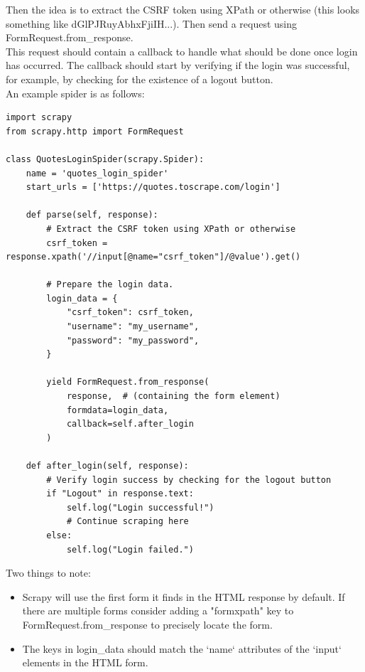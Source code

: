 \documentclass[8pt]{extarticle}
\begin{document}
\begin{multicols}{3}
Then the idea is to extract the CSRF token using XPath or otherwise (this looks something like dGlPJRuyAbhxFjiIH...). Then send a request using FormRequest.from\_response. \\

This request should contain a callback to handle what should be done once login has occurred. The callback should start by verifying if the login was successful, for example, by checking for the existence of a logout button.\\ 

An example spider is as follows:

\begin{lstlisting}[style=python]
import scrapy
from scrapy.http import FormRequest

class QuotesLoginSpider(scrapy.Spider):
    name = 'quotes_login_spider'
    start_urls = ['https://quotes.toscrape.com/login']

    def parse(self, response):
        # Extract the CSRF token using XPath or otherwise
        csrf_token = response.xpath('//input[@name="csrf_token"]/@value').get()

        # Prepare the login data. 
        login_data = {
            "csrf_token": csrf_token,
            "username": "my_username",
            "password": "my_password",
        }
        
        yield FormRequest.from_response(
            response,  # (containing the form element)
            formdata=login_data,
            callback=self.after_login
        )    
        
    def after_login(self, response):
        # Verify login success by checking for the logout button
        if "Logout" in response.text:
            self.log("Login successful!")
            # Continue scraping here
        else:
            self.log("Login failed.")
\end{lstlisting}

Two things to note:
\begin{itemize}
    \item Scrapy will use the first form it finds in the HTML response by default. If there are multiple forms consider adding a "formxpath" key to FormRequest.from\_response to precisely locate the form.
    \item The keys in login\_data should match the `name` attributes of the `input` elements in the HTML form.
\end{itemize}

\newpage
\end{multicols}
\end{document}

